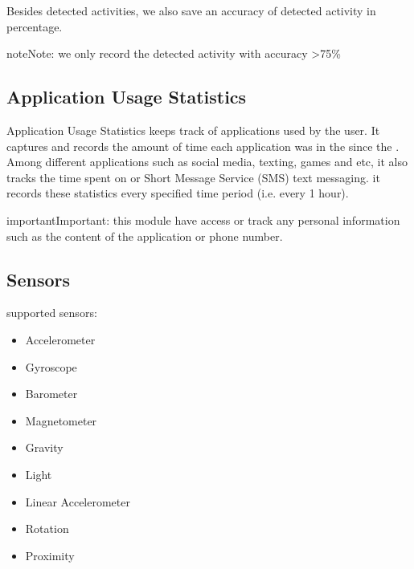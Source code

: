 \documentclass[letterpaper,10pt,english]{sphinxmanual}
\begin{document}
Besides detected activities, we also save an accuracy of detected activity in percentage.

\begin{sphinxadmonition}{note}{Note:}
we only record the detected activity with accuracy \textgreater{}75\%
\end{sphinxadmonition}

\begin{DUlineblock}{0em}
\item[] 
\end{DUlineblock}


\subsection{Application Usage Statistics}
\label{\detokenize{JuTrack_Social:application-usage-statistics}}\label{\detokenize{JuTrack_Social:labelapplicationusagestatistics}}
Application Usage Statistics keeps track of applications used by the user. It captures and records the amount of time each application was in the  since the .
Among different applications such as social media, texting, games and etc, it also tracks the time spent on  or Short Message Service (SMS) text messaging.
it records these statistics every specified time period (i.e. every 1 hour).

\begin{sphinxadmonition}{important}{Important:}
this module  have access or track any personal information such as the content of the application or phone number.
\end{sphinxadmonition}

\begin{DUlineblock}{0em}
\item[] 
\end{DUlineblock}


\subsection{Sensors}
\label{\detokenize{JuTrack_Social:sensors}}
supported sensors:
\begin{itemize}
\item {} 
Accelerometer

\item {} 
Gyroscope

\item {} 
Barometer

\item {} 
Magnetometer

\item {} 
Gravity

\item {} 
Light

\item {} 
Linear Accelerometer

\item {} 
Rotation

\item {} 
Proximity

\end{itemize}
\end{document}
